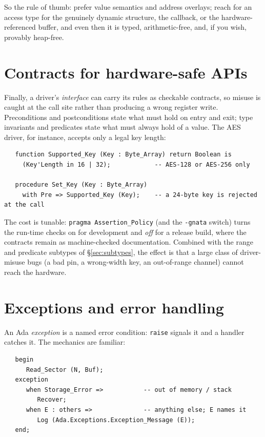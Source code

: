 So the rule of thumb: prefer value semantics and address overlays; reach for an
access type for the genuinely dynamic structure, the callback, or the
hardware-referenced buffer, and even then it is typed, arithmetic-free, and, if
you wish, provably heap-free.

\section{Contracts for hardware-safe APIs}
\label{sec:contracts}

Finally, a driver's \emph{interface} can carry its rules as checkable contracts,
so misuse is caught at the call site rather than producing a wrong register write.
Preconditions and postconditions state what must hold on entry and exit; type
invariants and predicates state what must always hold of a value. The AES driver,
for instance, accepts only a legal key length:

\begin{lstlisting}
   function Supported_Key (Key : Byte_Array) return Boolean is
     (Key'Length in 16 | 32);            -- AES-128 or AES-256 only

   procedure Set_Key (Key : Byte_Array)
     with Pre => Supported_Key (Key);    -- a 24-byte key is rejected at the call
\end{lstlisting}

The cost is tunable: \texttt{pragma Assertion\_Policy} (and the \texttt{-gnata}
switch) turns the run-time checks on for development and \emph{off} for a release
build, where the contracts remain as machine-checked documentation. Combined with
the range and predicate subtypes of \S\ref{sec:subtypes}, the effect is that a
large class of driver-misuse bugs (a bad pin, a wrong-width key, an
out-of-range channel) cannot reach the hardware.

\section{Exceptions and error handling}
\label{sec:exceptions}

An Ada \emph{exception} is a named error condition: \texttt{raise} signals it and
a handler catches it. The mechanics are familiar:

\begin{lstlisting}
   begin
      Read_Sector (N, Buf);
   exception
      when Storage_Error =>           -- out of memory / stack
         Recover;
      when E : others =>              -- anything else; E names it
         Log (Ada.Exceptions.Exception_Message (E));
   end;
\end{lstlisting}

